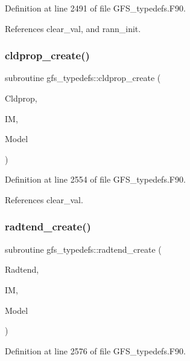 Definition at line 2491 of file G\+F\+S\+\_\+typedefs.\+F90.



References clear\+\_\+val, and rann\+\_\+init.

\mbox{\label{namespacegfs__typedefs_a897c5b06643b685a02790260794c041a}} 
\subsubsection{cldprop\+\_\+create()}
{\footnotesize\ttfamily subroutine gfs\+\_\+typedefs\+::cldprop\+\_\+create (\begin{DoxyParamCaption}\item[{class(\textbf{ gfs\+\_\+cldprop\+\_\+type})}]{Cldprop,  }\item[{integer, intent(in)}]{IM,  }\item[{type(\textbf{ gfs\+\_\+control\+\_\+type}), intent(in)}]{Model }\end{DoxyParamCaption})}



Definition at line 2554 of file G\+F\+S\+\_\+typedefs.\+F90.



References clear\+\_\+val.

\mbox{\label{namespacegfs__typedefs_a6d78a138b900fc2e8afb95f7ebf317ab}} 
\subsubsection{radtend\+\_\+create()}
{\footnotesize\ttfamily subroutine gfs\+\_\+typedefs\+::radtend\+\_\+create (\begin{DoxyParamCaption}\item[{class(\textbf{ gfs\+\_\+radtend\+\_\+type})}]{Radtend,  }\item[{integer, intent(in)}]{IM,  }\item[{type(\textbf{ gfs\+\_\+control\+\_\+type}), intent(in)}]{Model }\end{DoxyParamCaption})}



Definition at line 2576 of file G\+F\+S\+\_\+typedefs.\+F90.



